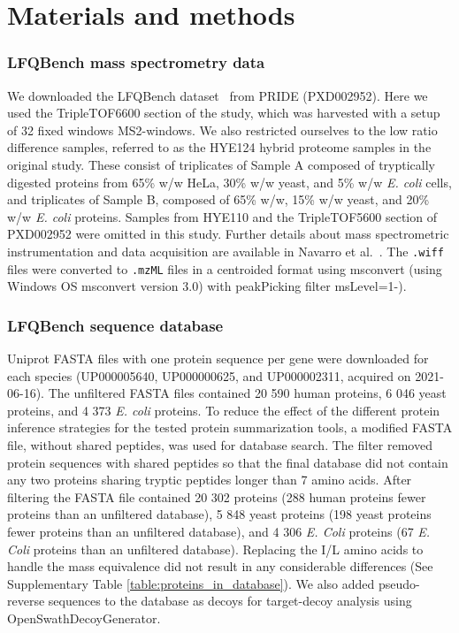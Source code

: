 \documentclass[10pt,letterpaper]{article}
\begin{document}
\section*{Materials and methods}


\subsubsection*{LFQBench mass spectrometry data}


We downloaded the LFQBench dataset~\cite{navarro2016multicenter} from PRIDE (PXD002952). Here we used the TripleTOF6600 section of the study, which was harvested with a setup of 32 fixed windows MS2-windows. We also restricted ourselves to the low ratio difference samples, referred to as the HYE124 hybrid proteome samples in the original study. These consist of triplicates of Sample A composed of tryptically digested proteins from 65\% w/w HeLa, 30\% w/w yeast, and 5\% w/w \textit{E. coli} cells, and triplicates of Sample B, composed of 65\% w/w, 15\% w/w yeast, and 20\% w/w \textit{E. coli} proteins. Samples from HYE110 and the TripleTOF5600 section of PXD002952 were omitted in this study. Further details about mass spectrometric instrumentation and data acquisition are available in Navarro et al.~\cite{navarro2016multicenter}. The \verb|.wiff| files were converted to \verb|.mzML| files in a centroided format using msconvert (using Windows OS msconvert version 3.0) with peakPicking filter msLevel=1-). 

\subsubsection*{LFQBench sequence database}

Uniprot FASTA files with one protein sequence per gene were downloaded for each species (UP000005640, UP000000625, and UP000002311, acquired on 2021-06-16). The unfiltered FASTA files contained 20 590 human proteins, 6 046 yeast proteins, and 4 373 \textit{E. coli} proteins. To reduce the effect of the different protein inference strategies for the tested protein summarization tools, a modified FASTA file, without shared peptides, was used for database search. The filter removed protein sequences with shared peptides so that the final database did not contain any two proteins sharing tryptic peptides longer than 7 amino acids. After filtering the FASTA file contained 20 302 proteins (288 human proteins fewer proteins than an unfiltered database), 5 848 yeast proteins (198 yeast proteins fewer proteins than an unfiltered database), and 4 306 \textit{E. Coli} proteins (67 \textit{E. Coli} proteins than an unfiltered database). Replacing the I/L amino acids to handle the mass equivalence did not result in any considerable differences (See Supplementary Table \ref{table:proteins_in_database}). We also added pseudo-reverse sequences to the database as decoys for target-decoy analysis using OpenSwathDecoyGenerator. 
\end{document}
